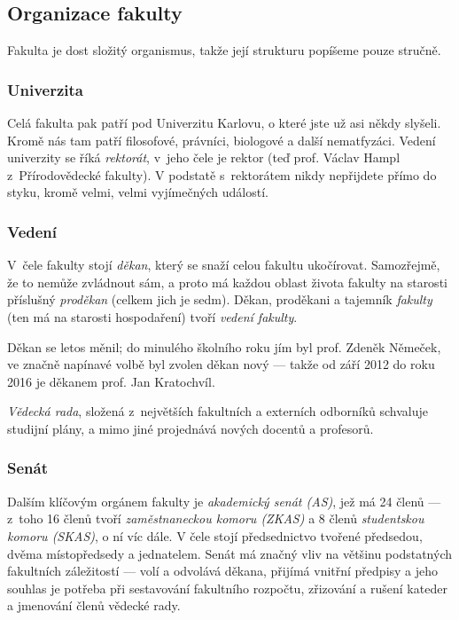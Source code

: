 \subsection{Organizace fakulty}
Fakulta je dost složitý organismus, takže její strukturu popíšeme pouze stručně.

\subsubsection{Univerzita}
Celá fakulta pak patří pod Univerzitu Karlovu, o které jste už asi někdy slyšeli. Kromě nás tam patří filosofové, právníci, biologové a další nematfyzáci. Vedení univerzity se říká {\it rektorát}, v~jeho čele je rektor (teď prof. Václav Hampl z~Pří\-ro\-do\-vě\-de\-cké fakulty). V podstatě s~rektorátem nikdy nepřijdete přímo do styku, kromě velmi, velmi vyjímečných událostí.

\subsubsection{Vedení}
V~čele fakulty stojí {\it děkan}, který se snaží celou fakultu ukočírovat. Samozřejmě, že to nemůže zvládnout sám, a proto má každou oblast života fakulty na starosti příslušný {\it proděkan} (celkem jich je sedm). Děkan, proděkani a tajemník {\it fakulty} (ten má na starosti hospodaření) tvoří {\it vedení fakulty}.

Děkan se letos měnil; do minulého školního roku jím byl prof. Zdeněk Němeček, ve značně napínavé volbě byl zvolen děkan nový --- takže od září 2012 do roku 2016 je děkanem prof. Jan Kratochvíl.

{\it Vědecká rada}, složená z~největších fakultních a externích odborníků schvaluje studijní plány, a mimo jiné projednává nových docentů a profesorů.

\subsubsection{Senát}
Dalším klíčovým orgánem fakulty je {\it akademický senát (AS)}, jež má 24 členů --- z~toho 16 členů tvoří {\it zaměstnaneckou komoru (ZKAS)} a 8 členů {\it studentskou komoru (SKAS)}, o ní víc dále. V čele stojí předsednictvo tvořené předsedou, dvěma místopředsedy a jednatelem. Senát má značný vliv na většinu podstatných fakultních záležitostí --- volí a odvolává děkana, přijímá vnitřní předpisy a jeho souhlas je potřeba při sestavování fakultního rozpočtu, zřizování a rušení kateder a jmenování členů vědecké rady.

